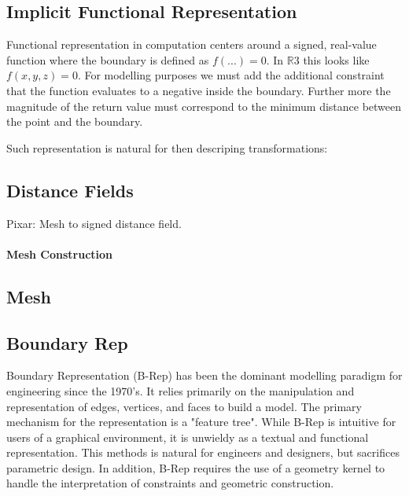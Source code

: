 \documentclass[a4paper]{article}
\begin{document}
\subsection{Implicit Functional Representation}

Functional representation in computation centers around a signed, real-value
function where the boundary is defined as $f(...) = 0$.
In $\mathbb{R}3$ this looks like $f(x,y,z) = 0$. For modelling purposes we must add the
additional constraint that the function evaluates to a negative inside the
boundary. Further more the magnitude of the return value must correspond to
the minimum distance between the point and the boundary. \cite{Olah_2011}


\cite{Shugrina_Shamir_Matusik_2015}

Such representation is natural for then descriping transformations:
\cite{Henderson_2002}

\subsection{Distance Fields}
Pixar:
\cite{OpenVDB}
Mesh to signed distance field.
\cite{Baerentzen_Aanaes}


\paragraph{Mesh Construction}
\cite{Tzur}



\subsection{Mesh}

\cite{Heckbert_Garland_1997}

\cite{Bischoff_Botsch_Steinberg_Bischoff_Kobbelt_Aachen_2002}

\subsection{Boundary Rep}
Boundary Representation (B-Rep) has been the dominant modelling paradigm
for engineering since the 1970's.
It relies primarily on the manipulation and representation of
edges, vertices, and faces to build a model.
The primary mechanism for the representation is a "feature tree".
While B-Rep is intuitive for users of a graphical environment,
it is unwieldy as a textual and functional representation.
This methods is natural for engineers and designers, but sacrifices
parametric design. In addition, B-Rep requires the use of a geometry kernel
to handle the interpretation of constraints and geometric construction. \cite{stroud2006boundary}
\end{document}
